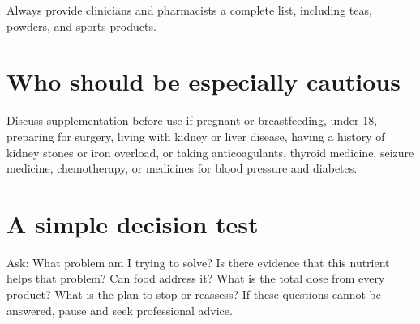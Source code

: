 Always provide clinicians and pharmacists a complete list, including teas, powders, and sports products. \cite{fdaSupplements}

\section{Who should be especially cautious}
Discuss supplementation before use if pregnant or breastfeeding, under 18, preparing for surgery, living with kidney or liver disease, having a history of kidney stones or iron overload, or taking anticoagulants, thyroid medicine, seizure medicine, chemotherapy, or medicines for blood pressure and diabetes. \cite{odsSafety,fdaSupplements,odsPregnancy,nciCancerInteractions}

\section{A simple decision test}
Ask: What problem am I trying to solve? Is there evidence that this nutrient helps that problem? Can food address it? What is the total dose from every product? What is the plan to stop or reassess? If these questions cannot be answered, pause and seek professional advice.
